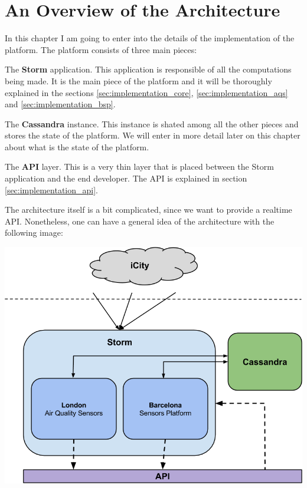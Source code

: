  
\section{An Overview of the Architecture}
\label{sec:implementation_intro}

In this chapter I am going to enter into the details of the implementation of
the platform. The platform consists of three main pieces:

\mylist
  \item The {\bf Storm} application. This application is responsible of all the
computations being made. It is the main piece of the platform and it will be
thoroughly explained in the sections \ref{sec:implementation_core},
\ref{sec:implementation_aqs} and \ref{sec:implementation_bsp}.
  \item The {\bf Cassandra} instance. This instance is shated among all the
other pieces and stores the state of the platform. We will enter in more detail
later on this chapter about what is the state of the platform.
  \item The {\bf API} layer. This is a very thin layer that is placed between
the Storm application and the end developer. The API is explained in section
\ref{sec:implementation_api}.
\mylistend

The architecture itself is a bit complicated, since we want to provide a
realtime API. Nonetheless, one can have a general idea of the architecture with
the following image:

\begin{center}
  \includegraphics[scale=0.5]{implementation/images/platform.png}
\end{center}


